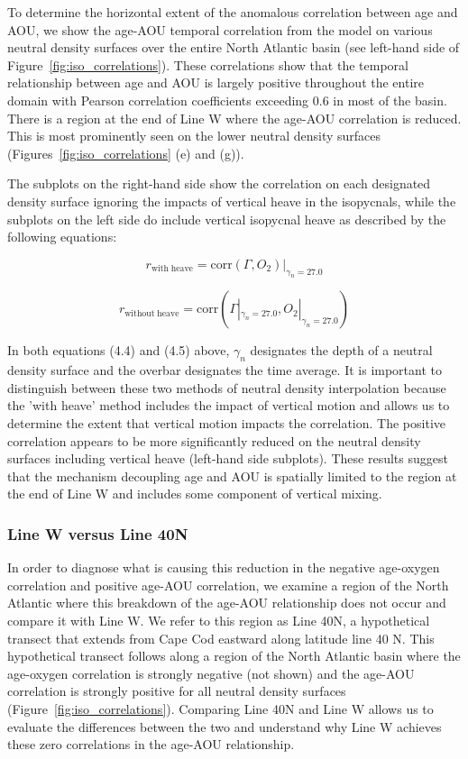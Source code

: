 To determine the horizontal extent of the anomalous correlation between age and
AOU, we show the age-AOU temporal correlation from the model on various neutral
density surfaces over the entire North Atlantic basin (see left-hand side of
Figure~\ref{fig:iso_correlations}). These correlations show that the temporal
relationship between age and AOU is largely positive throughout the entire domain
with Pearson correlation coefficients exceeding 0.6 in most of the basin. There
is a region at the end of Line W where the age-AOU correlation is reduced. This
is most prominently seen on the lower neutral density surfaces
(Figures~\ref{fig:iso_correlations} (e) and (g)).

The subplots on the right-hand side show the correlation on each designated
density surface ignoring the impacts of vertical heave in the isopycnals, while
the subplots on the left side do include vertical isopycnal heave as described
by the following equations:

\begin{equation}
	r_{\mathrm{with \; heave}} = \mathrm{corr}(\Gamma, O_2)|_{\gamma_n = 27.0}
\end{equation}

\begin{equation}
	r_{\mathrm{without \; heave}} = \mathrm{corr}(\Gamma|_{\gamma_n = 27.0}, O_2|_{\gamma_n = 27.0})
\end{equation}

In both equations (4.4) and (4.5) above, $\gamma_n$ designates the depth of a
neutral density surface and the overbar designates the time average. It is
important to distinguish between these two methods of neutral density interpolation
because the 'with heave' method includes the impact of vertical motion and allows
us to determine the extent that vertical motion impacts the correlation. The
positive correlation appears to be more significantly reduced on the neutral density
surfaces including vertical heave (left-hand side subplots). These results
suggest that the mechanism decoupling age and AOU is spatially limited to the
region at the end of Line W and includes some component of vertical mixing.

\subsubsection{Line W versus Line 40N}
In order to diagnose what is causing this reduction in the negative age-oxygen
correlation and positive age-AOU correlation, we examine a region of the North
Atlantic where this breakdown of the age-AOU relationship does not occur and compare
it with Line W. We refer to this region as Line 40N, a hypothetical transect that
extends from Cape Cod eastward along latitude line 40 N. This hypothetical
transect follows along a region of the North Atlantic basin where the age-oxygen
correlation is strongly negative (not shown) and the age-AOU correlation is
strongly positive for all neutral density surfaces (Figure~\ref{fig:iso_correlations}).
Comparing Line 40N and Line W allows us to evaluate the differences between the
two and understand why Line W achieves these zero correlations in the age-AOU
relationship.

